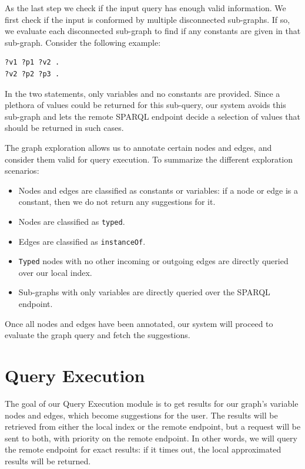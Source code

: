 As the last step we check if the input query has enough valid information. We first check if the input is conformed by multiple disconnected sub-graphs. If so, we evaluate each disconnected sub-graph to find if any constants are given in that sub-graph. Consider the following example: 
\begin{verbatim}
?v1 ?p1 ?v2 . 
?v2 ?p2 ?p3 .
\end{verbatim}
In the two statements, only variables and no constants are provided.
Since a plethora of values could be returned for this sub-query, our system avoids this sub-graph and lets the remote SPARQL endpoint decide a selection of values that should be returned in such cases.

The graph exploration allows us to annotate certain nodes and edges, and consider them valid for query execution. To summarize the different exploration scenarios:
\begin{itemize}
    \item Nodes and edges are classified as constants or variables: if a node or edge is a constant, then we do not return any suggestions for it.
    \item Nodes are classified as \texttt{typed}.
    \item Edges are classified as \texttt{instanceOf}.
    \item \texttt{Typed} nodes with no other incoming or outgoing edges are directly queried over our local index.
    \item Sub-graphs with only variables are directly queried over the SPARQL endpoint.
\end{itemize}

Once all nodes and edges have been annotated, our system will proceed to evaluate the graph query and fetch the suggestions. 


\section{Query Execution}
\label{chap:execution}

The goal of our Query Execution module is to get results for our graph's variable nodes and edges, which become suggestions for the user. The results will be retrieved from either the local index or the remote endpoint, but a request will be sent to both, with priority on the remote endpoint. In other words, we will query the remote endpoint for exact results: if it times out, the local approximated results will be returned.

